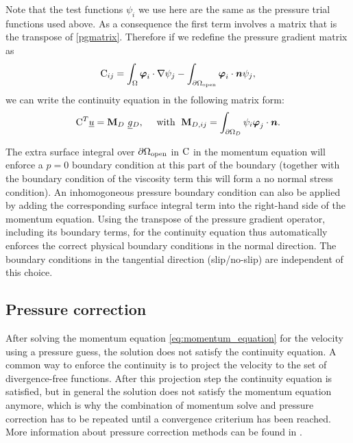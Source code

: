 Note that the test functions $\psi_i$ we use here are the
same as the pressure trial functions used above. As a consequence
the first term involves a matrix that is the
transpose of \eqref{pgmatrix}. Therefore if we redefine the pressure
gradient matrix as
\begin{equation*}
  \mathrm{C}_{ij}=\int_\Omega {\mbox{\boldmath$\varphi$}}_i\cdot\nabla\psi_j
    -\int_{{\partial\Omega}_{\mathrm{open}}} {\mbox{\boldmath$\varphi$}}_i\cdot{\mbox{\boldmath$n$}}\psi_j ,
\end{equation*}
we can write the continuity equation in the following matrix form:
\begin{equation}
  \mathrm{C}^T \underline{u}=
    {\mbox{\boldmath$\mathrm{M}$}}_D ~\underline{g}{}_D,
    \quad\text{ with }\;
    {\mbox{\boldmath$\mathrm{M}$}}_{D,ij}=\int_{{\partial\Omega}_D} \psi_i{\mbox{\boldmath$\varphi$}}_j\cdot{\mbox{\boldmath$n$}}.
  \label{discrete_incompressible_continuity}
\end{equation}

The extra surface integral over ${\partial\Omega}_{\mathrm{open}}$ in
$\mathrm{C}$ in the momentum equation will enforce
a $p=0$ boundary condition at this part of the boundary (together with the
boundary condition of the viscosity term this will form a no normal stress
condition). An inhomogoneous pressure boundary condition can also
be applied by adding the corresponding
surface integral term into the right-hand side of the momentum equation.
Using the transpose of the pressure gradient operator, including its
boundary terms, for the continuity equation thus automatically
enforces the correct physical boundary conditions in the normal
direction.
The boundary
conditions in the tangential direction (slip/no-slip) are independent of this choice.

\subsection{Pressure correction}\label{Sect:pressure_correction}

After solving the momentum equation \eqref{eq:momentum_equation} for the
velocity using a pressure guess, the solution does not satisfy the
continuity equation. A common way to enforce the continuity is to project
the velocity to the set of divergence-free functions. After this projection
step the continuity equation is satisfied, but in general the solution does
not satisfy the momentum equation anymore, which is why the combination of
momentum solve and pressure correction has to be repeated until a
convergence criterium has been reached.
More information about pressure correction methods can be
found in \cite{gresho1988}.


